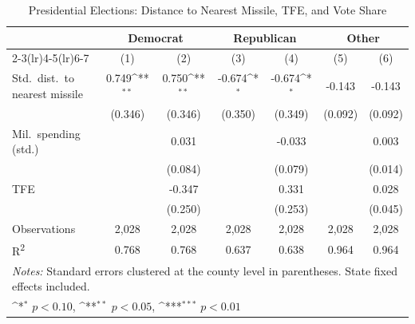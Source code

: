 \begin{table}[htbp]\centering
\setlength{\tabcolsep}{5pt}
\small
\def\sym#1{\ifmmode^{#1}\else\(^{#1}\)\fi}
\caption{Presidential Elections: Distance to Nearest Missile, TFE, and Vote Share}
\begin{tabular}{l*{6}{c}}
\toprule
                    &\multicolumn{2}{c}{Democrat}&\multicolumn{2}{c}{Republican}&\multicolumn{2}{c}{Other}\\
\cmidrule(lr){2-3}\cmidrule(lr){4-5}\cmidrule(lr){6-7}
                    &\multicolumn{1}{c}{(1)}&\multicolumn{1}{c}{(2)}&\multicolumn{1}{c}{(3)}&\multicolumn{1}{c}{(4)}&\multicolumn{1}{c}{(5)}&\multicolumn{1}{c}{(6)}\\
\midrule
Std.\ dist.\ to nearest missile
                    &       0.749\sym{**} &       0.750\sym{**} &      -0.674\sym{*}  &      -0.674\sym{*}  &      -0.143         &      -0.143         \\
                    &     (0.346)         &     (0.346)         &     (0.350)         &     (0.349)         &     (0.092)         &     (0.092)         \\
Mil.\ spending (std.)
                    &                     &       0.031         &                     &      -0.033         &                     &       0.003         \\
                    &                     &     (0.084)         &                     &     (0.079)         &                     &     (0.014)         \\
TFE                 &                     &      -0.347         &                     &       0.331         &                     &       0.028         \\
                    &                     &     (0.250)         &                     &     (0.253)         &                     &     (0.045)         \\
\midrule
Observations        &       2,028         &       2,028         &       2,028         &       2,028         &       2,028         &       2,028         \\
R\textsuperscript{2}&       0.768         &       0.768         &       0.637         &       0.638         &       0.964         &       0.964         \\
\bottomrule
\multicolumn{7}{l}{\footnotesize \textit{Notes:} Standard errors clustered at the county level in parentheses. State fixed effects included.}\\
\multicolumn{7}{l}{\footnotesize \sym{*} \(p<0.10\), \sym{**} \(p<0.05\), \sym{***} \(p<0.01\)}\\
\end{tabular}
\end{table}
